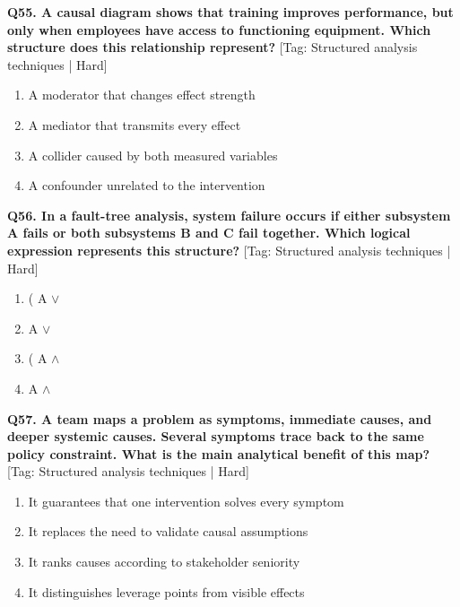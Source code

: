 \noindent\textbf{Q55. A causal diagram shows that training improves performance, but only when employees have access to functioning equipment. Which structure does this relationship represent?} \hfill [Tag: Structured analysis techniques | Hard]
\begin{enumerate}[label=(\alph*),topsep=2pt,itemsep=1pt,partopsep=0pt,parsep=0pt]
    \item {A moderator that changes effect strength}
    \item {A mediator that transmits every effect}
    \item {A collider caused by both measured variables}
    \item {A confounder unrelated to the intervention}
\end{enumerate}
\vspace{2mm}

\noindent\textbf{Q56. In a fault-tree analysis, system failure occurs if either subsystem A fails or both subsystems B and C fail together. Which logical expression represents this structure?} \hfill [Tag: Structured analysis techniques | Hard]
\begin{enumerate}[label=(\alph*),topsep=2pt,itemsep=1pt,partopsep=0pt,parsep=0pt]
    \item {( A $\lor$}
    \item {A $\lor$}
    \item {( A $\land$}
    \item {A $\land$}
\end{enumerate}
\vspace{2mm}

\noindent\textbf{Q57. A team maps a problem as symptoms, immediate causes, and deeper systemic causes. Several symptoms trace back to the same policy constraint. What is the main analytical benefit of this map?} \hfill [Tag: Structured analysis techniques | Hard]
\begin{enumerate}[label=(\alph*),topsep=2pt,itemsep=1pt,partopsep=0pt,parsep=0pt]
    \item {It guarantees that one intervention solves every symptom}
    \item {It replaces the need to validate causal assumptions}
    \item {It ranks causes according to stakeholder seniority}
    \item {It distinguishes leverage points from visible effects}
\end{enumerate}
\vspace{2mm}

